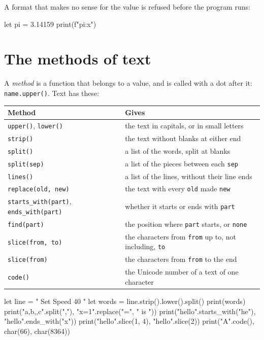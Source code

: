 A format that makes no sense for the value is refused before the
program runs:

\begin{zeno}[fails=yes]
let pi = 3.14159
print(f"{pi:x}")
\end{zeno}

\section{The methods of text}

A \emph{method} is a function that belongs to a value, and is called
with a dot after it: \verb|name.upper()|. Text has these:

\begin{center}
\begin{tabular}{lP{8.5cm}}
\toprule
Method & Gives \\
\midrule
\verb|upper()|, \verb|lower()| & the text in capitals, or in small letters \\
\verb|strip()| & the text without blanks at either end \\
\verb|split()| & a list of the words, split at blanks \\
\verb|split(sep)| & a list of the pieces between each \verb|sep| \\
\verb|lines()| & a list of the lines, without their line ends \\
\verb|replace(old, new)| & the text with every \verb|old| made \verb|new| \\
\verb|starts_with(part)|, \verb|ends_with(part)| & whether it starts or ends with \verb|part| \\
\verb|find(part)| & the position where \verb|part| starts, or \verb|none| \\
\verb|slice(from, to)| & the characters from \verb|from| up to, not including, \verb|to| \\
\verb|slice(from)| & the characters from \verb|from| to the end \\
\verb|code()| & the Unicode number of a text of one character \\
\bottomrule
\end{tabular}
\end{center}

\begin{zeno}
let line = "  Set Speed 40  "
let words = line.strip().lower().split()
print(words)
print("a,b,,c".split(","), "x=1".replace("=", " is "))
print("hello".starts_with("he"), "hello".ends_with("x"))
print("hello".slice(1, 4), "hello".slice(2))
print("A".code(), char(66), char(8364))
\end{zeno}

